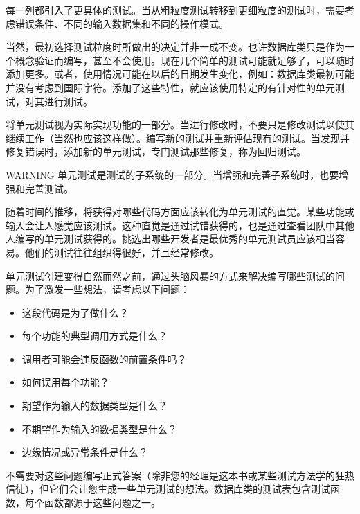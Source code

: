 每一列都引入了更具体的测试。当从粗粒度测试转移到更细粒度的测试时，需要考虑错误条件、不同的输入数据集和不同的操作模式。

当然，最初选择测试粒度时所做出的决定并非一成不变。也许数据库类只是作为一个概念验证而编写，甚至不会使用。现在几个简单的测试可能就足够了，可以随时添加更多。或者，使用情况可能在以后的日期发生变化，例如：数据库类最初可能并没有考虑到国际字符。添加了这些特性，就应该使用特定的有针对性的单元测试，对其进行测试。

将单元测试视为实际实现功能的一部分。当进行修改时，不要只是修改测试以使其继续工作（当然也应该这样做）。编写新的测试并重新评估现有的测试。当发现并修复错误时，添加新的单元测试，专门测试那些修复，称为回归测试。

\begin{myWarning}{WARNING}
单元测试是测试的子系统的一部分。当增强和完善子系统时，也要增强和完善测试。
\end{myWarning}


随着时间的推移，将获得对哪些代码方面应该转化为单元测试的直觉。某些功能或输入会让人感觉应该测试。这种直觉是通过试错获得的，也是通过查看团队中其他人编写的单元测试获得的。挑选出哪些开发者是最优秀的单元测试员应该相当容易。他们的测试往往组织得很好，并且经常修改。

单元测试创建变得自然而然之前，通过头脑风暴的方式来解决编写哪些测试的问题。为了激发一些想法，请考虑以下问题：

\begin{itemize}
\item
这段代码是为了做什么？

\item
每个功能的典型调用方式是什么？

\item
调用者可能会违反函数的前置条件吗？

\item
如何误用每个功能？

\item
期望作为输入的数据类型是什么？

\item
不期望作为输入的数据类型是什么？

\item
边缘情况或异常条件是什么？
\end{itemize}

不需要对这些问题编写正式答案（除非您的经理是这本书或某些测试方法学的狂热信徒），但它们会让您生成一些单元测试的想法。数据库类的测试表包含测试函数，每个函数都源于这些问题之一。

